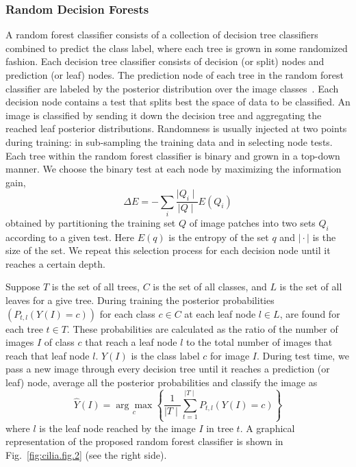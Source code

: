 \subsubsection{\textbf{Random Decision Forests}}
A random forest classifier consists of a collection of decision tree classifiers combined to predict the class label, where each tree is grown in some randomized fashion. Each decision tree classifier consists of decision (or split) nodes and prediction (or leaf) nodes. The prediction node of each tree in the random forest classifier are labeled by the posterior distribution over the image classes~\cite{bosch_Image_2007}. Each decision node contains a test that splits best the space of data to be classified. An image is classified by sending it down the decision tree and aggregating the reached leaf posterior distributions. Randomness is usually injected at two points during training: in sub-sampling the training data and in selecting node tests. Each tree within the random forest classifier is binary and grown in a top-down manner. We choose the binary test at each node by maximizing the information gain,
\begin{equation}
\Delta E = -\sum_{i}\frac{\mid Q_{i}\mid}{\mid Q\mid}E(Q_{i})
\label{eq:cilia.eq.2}
\end{equation}
obtained by partitioning the training set $Q$ of image patches into two sets $Q_{i}$ according to a given test. Here $E(q)$ is the entropy of the set $q$ and $\mid \cdot\mid$ is the size of the set. We repeat this selection process for each decision node until it reaches a certain depth.

Suppose $T$ is the set of all trees, $C$ is the set of all classes, and $L$ is the set of all leaves for a give tree. During training the posterior probabilities $\left(P_{t,l}(Y(I) = c)\right)$ for each class $c \in C$ at each leaf node $l \in L$, are found for each tree $t \in T$. These probabilities are calculated as the ratio of the number of images $I$ of class $c$ that reach a leaf node $l$ to the total number of images that reach that leaf node $l$. $Y(I)$ is the class label $c$ for image $I$. During test time, we pass a new image through every decision tree until it reaches a prediction (or leaf) node, average all the posterior probabilities and classify the image as
\begin{equation}
\hat{Y}(I) = \underset{c}{\arg \max}\left\{\frac{1}{\mid T\mid}\sum_{t=1}^{\mid T\mid} P_{t,l}(Y(I) = c)\right\}
\label{eq:cilia.eq.3}
\end{equation}
where $l$ is the leaf node reached by the image $I$ in tree $t$. A graphical representation of the proposed random forest classifier is shown in Fig.~\ref{fig:cilia.fig.2} (see the right side).
\pagebreak


